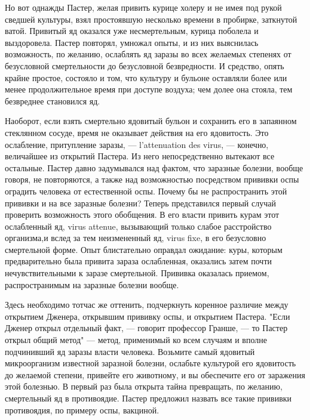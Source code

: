 Но вот однажды Пастер, желая привить  курице холеру и не имея под  рукой
сведшей  культуры,  взял  простоявшую  несколько  времени  в   пробирке,
заткнутой ватой. Привитый яд оказался уже несмертельным, курица поболела
и выздоровела.  Пастер  повторял, умножал  опыты,  и из  них  выяснилась
возможность, по желанию, ослаблять яд  заразы во всех желаемых  степенях
от безусловной смертельности  до безусловной  безвредности. И  средство,
опять крайне простое, состояло и  том, что культуру и бульоне  оставляли
более или менее продолжительное время при доступе воздуха; чем долее она
стояла, тем безвреднее становился яд.

Наоборот, если  взять  смертельно  ядовитый бульон  и  сохранить  его  в
запаянном  стеклянном  сосуде,  время  не  оказывает  действия  на   его
ядовитость. Это  ослабление,  притупление заразы,  ---  l'attenuation  des
virus,  ---   конечно,   величайшее   из   открытий   Пастера.   Из   него
непосредственно вытекают  все остальные.  Пастер давно  задумывался  над
фактом, что заразные болезни, вообще говоря, не повторяются, а также над
возможностью посредством прививки оспы оградить человека от естественной
оспы. Почему  бы  не распространить  этой  прививки и  на  все  заразные
болезни? Теперь представился первый  случай проверить возможность  этого
обобщения. В  его  власти  привить  курам  этот  ослабленный  яд,  virus
attenue, вызывающий только слабое расстройство организма,и вслед за  тем
неизмененный яд, virus  fixe, в его  безусловно смертельной форме.  Опыт
блистательно  оправдал  ожидание:  куры,  которым  предварительно   была
привита зараза ослабленная,  оказались затем  почти нечувствительными  к
заразе  смертельной.  Прививка  оказалась  приемом,  распространимым  на
заразные болезни вообще.

Здесь необходимо тотчас же оттенить, подчеркнуть коренное различие между
открытием Дженера, открывшим прививку  оспы, и открытием Пастера.  "Если
Дженер открыл отдельный факт,  --- говорит профессор  Гранше, --- то  Пастер
открыл общий  метод"  ---  метод,  применимый ко  всем  случаям  и  вполне
подчинивший  яд  заразы   власти  человека.   Возьмите  самый   ядовитый
микроорганизм  известной  заразной   болезни,  ослабьте  культурой   его
ядовитость до желаемой степени, привейте его животному, и вы  обеспечите
его от  заражения  этой  болезнью.  В  первый  раз  была  открыта  тайна
превращать, по желанию, смертельный  яд в противоядие. Пастер  предложил
назвать все такие прививки противоядия, по примеру оспы, вакциной.

